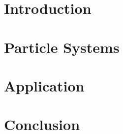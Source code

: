 \documentclass[a4paper, 12pt]{report}
\begin{document}


\newpage
\thispagestyle{empty}
\null
\newpage

\tableofcontents

\newpage



\newpage


\chapter{Introduction}


\chapter{Particle Systems}


\chapter{Application}


\chapter{Conclusion}


\end{document}
